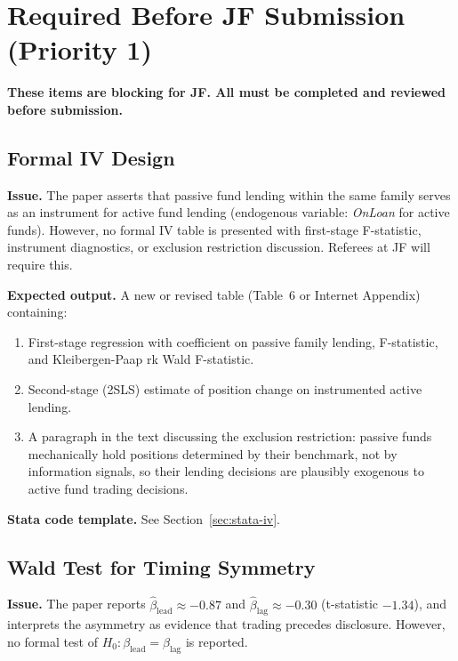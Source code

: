 \documentclass[11pt, a4paper]{article}
\begin{document}
\section{Required Before JF Submission (Priority 1)}

\textcolor{critred}{\textbf{These items are blocking for JF. All must be completed and reviewed before submission.}}

\subsection{Formal IV Design}

\textbf{Issue.} The paper asserts that passive fund lending within the same family serves as an
instrument for active fund lending (endogenous variable: \textit{OnLoan} for active funds).
However, no formal IV table is presented with first-stage F-statistic, instrument diagnostics,
or exclusion restriction discussion. Referees at JF will require this.

\textbf{Expected output.} A new or revised table (Table~6 or Internet Appendix) containing:
\begin{enumerate}[leftmargin=2em]
  \item First-stage regression with coefficient on passive family lending, F-statistic, and
        Kleibergen-Paap rk Wald F-statistic.
  \item Second-stage (2SLS) estimate of position change on instrumented active lending.
  \item A paragraph in the text discussing the exclusion restriction: passive funds mechanically
        hold positions determined by their benchmark, not by information signals, so their
        lending decisions are plausibly exogenous to active fund trading decisions.
\end{enumerate}

\textbf{Stata code template.} See Section~\ref{sec:stata-iv}.

\subsection{Wald Test for Timing Symmetry}

\textbf{Issue.} The paper reports $\hat{\beta}_{\text{lead}} \approx -0.87$ and
$\hat{\beta}_{\text{lag}} \approx -0.30$ (t-statistic $-1.34$), and interprets the asymmetry
as evidence that trading precedes disclosure. However, no formal test of
$H_0: \beta_{\text{lead}} = \beta_{\text{lag}}$ is reported.
\end{document}
